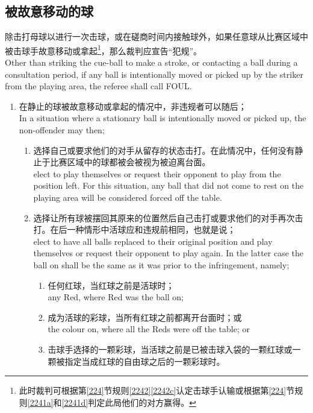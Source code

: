\subsection{被故意移动的球}\label{22316}

\noindent 除击打母球以进行一次击球，或在磋商时间内接触球外，如果任意球从比赛区域中被击球手故意移动或拿起\footnote{此时裁判可根据第\ref{224}节规则\ref{2242}\ref{2242c}认定击球手认输或根据第\ref{224}节规则\ref{2241a}和\ref{2241d}判定此局他们的对方赢得。}，那么裁判应宣告``犯规''。\\
Other than striking the cue-ball to make a stroke, or contacting a ball during a consultation period, if any ball is intentionally moved or picked up by the striker from the playing area, the referee shall call FOUL.
\begin{enumerate}[label=(\alph*)]
    \item \label{22316a}在静止的球被故意移动或拿起的情况中，非违规者可以随后；\\
    In a situation where a stationary ball is intentionally 
    moved or picked up, the non-offender may then;
    \begin{enumerate}[label=(\roman*)]
        \item 选择自己或要求他们的对手从留存的状态击打。在此情况中，任何没有静止于比赛区域中的球都被会被视为被迫离台面。\\
        elect to play themselves or request their opponent to play from the position left. For this situation, any ball that did not come to rest on the playing area will be considered forced off the table.
        \item 选择让所有球被摆回其原来的位置然后自己击打或要求他们的对手再次击打。在后一种情形中活球应和违规前相同，也就是说；\\
        elect to have all balls replaced to their original position and play themselves or request their opponent to play again. In the latter case the ball on shall be the same as it was prior to the infringement, namely;
        \begin{enumerate}[label=(\roman*)]
            \item 任何红球，当红球之前是活球时；\\
            any Red, where Red was the ball on;
            \item 成为活球的彩球，当所有红球之前都离开台面时；或\\
            the colour on, where all the Reds were off the table; or
            \item 击球手选择的一颗彩球，当活球之前是已被击球入袋的一颗红球或一颗被指定当成红球的自由球之后的一颗彩球时。\\

\end{enumerate}
\end{enumerate}
\end{enumerate}
